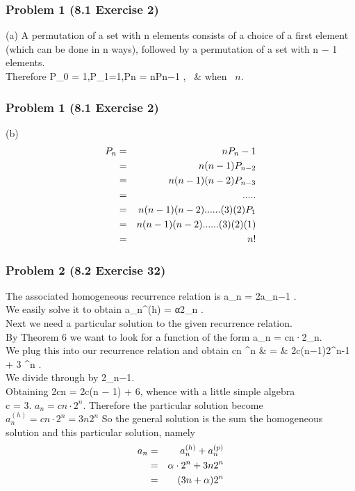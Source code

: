 \documentclass[12pt,hyperref={bookmarks=false}]{beamer}
\begin{document}
	\begin{frame}
	\frametitle{Problem 1 (8.1 Exercise 2)}
	\fontsize{10}{10pt}\selectfont
    (a) A permutation of a set with n elements consists of a choice of a first element (which can be done in n
ways), followed by a permutation of a set with n − 1 elements. \\
Therefore  P_0 = 1,P_1=1,Pn = nPn−1 ,~ &  when ~$n$.\\
    
	\end{frame}
	\begin{frame}
	\frametitle{Problem 1 (8.1 Exercise 2)}
	\fontsize{10}{10pt}\selectfont
    \vspace{0.3cm}
	(b)\begin{eqnarray*}{\fontsize{10}{10pt}}
    P_{n} & = & nP_{n} - 1\\
	~ & = & n(n -1)P_{n-2}\\
	~ & = & n(n -1)(n - 2)P_{n-3}\\
	~ & = & .....\\
	~ & = & n(n -1)(n - 2)......(3)(2)P_{1}\\
	~ & = & n(n -1)(n - 2)......(3)(2)(1)\\
	~ & = & n!\\
    \end{eqnarray*}
	\end{frame}
	\begin{frame}
	\frametitle{Problem 2 (8.2 Exercise 32)}
	\fontsize{10}{10pt}\selectfont
	\vspace{0.3cm}
	The associated homogeneous recurrence relation is a_{n} = 2a_{n−1} . \\
	We easily solve it to obtain a_{n}^{(h)} = α2_{n} .\\
	 Next we need a particular solution to the given recurrence relation.\\
	  By Theorem 6 we want to look for a function of the form a_{n} = cn·2_{n}.\\ We plug this into our recurrence relation and obtain cn ^n & = & 2c(n−1)2^{n-1} + 3 ^n .\\
We divide through by 2_{n−1}.\\
Obtaining 2cn = 2c(n − 1) + 6, whence with a little simple algebra \\c = 3. $a_{n} = cn \cdot 2^n$.
	Therefore the particular solution become $a_{n}^{(h)} = cn \cdot 2^n = 3n2^n $ So the general solution is the sum the homogeneous solution and this particular solution, namely 
	\begin{eqnarray*}{\fontsize{10}{10pt}}{\arraycolsep=1pt}
	 a_{n} & = & a_{n}^{(h)} + a_{n}^{(p)} \\
	 ~ & = & \alpha \cdot 2^n + 3n2^n \\
	 ~ & = & (3n + \alpha )2^n \\
	\end{eqnarray*}
	\end{frame}		%
\end{document}
